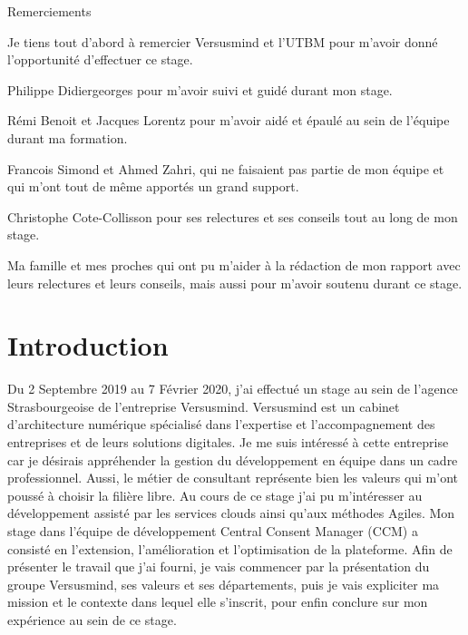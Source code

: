 \documentclass[12pt, a4paper]{report}
\begin{document}
\makeutbmfrontcover{}
\begin{center}
    \Huge{Remerciements}\newline
\end{center}
Je tiens tout d'abord à remercier Versusmind et l'UTBM pour m'avoir donné l'opportunité d'effectuer ce stage.\newline

Philippe Didiergeorges pour m'avoir suivi et guidé durant mon stage.\newline

Rémi Benoit et Jacques Lorentz pour m'avoir aidé et épaulé au sein de l'équipe durant ma formation.\newline

Francois Simond et Ahmed Zahri, qui ne faisaient pas partie de mon équipe et qui m'ont tout de même apportés un grand support.\newline

Christophe Cote-Collisson pour ses relectures et ses conseils tout au long de mon stage.\newline

Ma famille et mes proches qui ont pu m'aider à la rédaction de mon rapport avec leurs relectures et leurs conseils, mais aussi pour m'avoir soutenu durant ce stage.
\newpage
\tableofcontents
\chapter{Introduction}
Du 2 Septembre 2019 au 7 Février 2020, j'ai effectué un stage au sein de l'agence Strasbourgeoise de l'entreprise Versusmind.\newline
Versusmind est un cabinet d'architecture numérique spécialisé dans l'expertise et l'accompagnement des entreprises et de leurs solutions digitales.\newline
Je me suis intéressé à cette entreprise car je désirais appréhender la gestion du développement en équipe dans un cadre professionnel.
Aussi, le métier de consultant représente bien les valeurs qui m'ont poussé à choisir la filière libre.\newline
Au cours de ce stage j'ai pu m'intéresser au développement assisté par les services clouds ainsi qu'aux méthodes Agiles.\newline
Mon stage dans l'équipe de développement Central Consent Manager (CCM) a consisté en l'extension, l'amélioration et l'optimisation de la plateforme.\newline
Afin de présenter le travail que j'ai fourni, je vais commencer par la présentation du groupe Versusmind, ses valeurs et ses départements, puis je vais expliciter ma mission et le contexte dans lequel elle s'inscrit, pour enfin conclure sur mon expérience au sein de ce stage.
\end{document}
